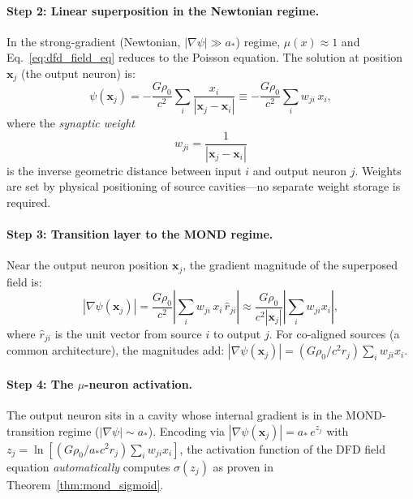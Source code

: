 \documentclass[11pt]{article}
\theoremstyle{definition}
\theoremstyle{remark}
\newcommand{\astar}{a_*}
\newcommand{\mufn}{\mu}
\begin{document}
\paragraph{Step 2: Linear superposition in the Newtonian regime.}
In the strong-gradient (Newtonian, $|\nabla\psi|\gg\astar$) regime,
$\mufn(x)\approx 1$ and Eq.~\eqref{eq:dfd_field_eq} reduces to the Poisson
equation. The solution at position $\mathbf{x}_j$ (the output neuron) is:
\begin{equation}
\psi(\mathbf{x}_j) = -\frac{G\rho_0}{c^2}\sum_i \frac{x_i}{|\mathbf{x}_j - \mathbf{x}_i|}
\equiv -\frac{G\rho_0}{c^2}\sum_i w_{ji}\,x_i,
\label{eq:psi_weighted_sum}
\end{equation}
where the \emph{synaptic weight}
\begin{equation}
\boxed{w_{ji} = \frac{1}{|\mathbf{x}_j - \mathbf{x}_i|}}
\label{eq:weight_distance}
\end{equation}
is the inverse geometric distance between input $i$ and output neuron $j$.
Weights are set by physical positioning of source cavities---no separate
weight storage is required.

\paragraph{Step 3: Transition layer to the MOND regime.}
Near the output neuron position $\mathbf{x}_j$, the gradient magnitude
of the superposed field is:
\begin{equation}
|\nabla\psi(\mathbf{x}_j)| = \frac{G\rho_0}{c^2}
\left|\sum_i w_{ji}\,x_i\,\hat{r}_{ji}\right|
\approx \frac{G\rho_0}{c^2|\mathbf{x}_j|}\left|\sum_i w_{ji} x_i\right|,
\label{eq:gradient_at_output}
\end{equation}
where $\hat{r}_{ji}$ is the unit vector from source $i$ to output $j$.
For co-aligned sources (a common architecture), the magnitudes add:
$|\nabla\psi(\mathbf{x}_j)| = (G\rho_0/c^2 r_j)\sum_i w_{ji}x_i$.

\paragraph{Step 4: The $\mu$-neuron activation.}
The output neuron sits in a cavity whose internal gradient is in the
MOND-transition regime ($|\nabla\psi|\sim\astar$). Encoding via
$|\nabla\psi(\mathbf{x}_j)| = \astar\,e^{z_j}$ with
$z_j = \ln[(G\rho_0/\astar c^2 r_j)\sum_i w_{ji}x_i]$, the activation
function of the DFD field equation \emph{automatically} computes
$\sigma(z_j)$ as proven in Theorem~\ref{thm:mond_sigmoid}.
\end{document}
